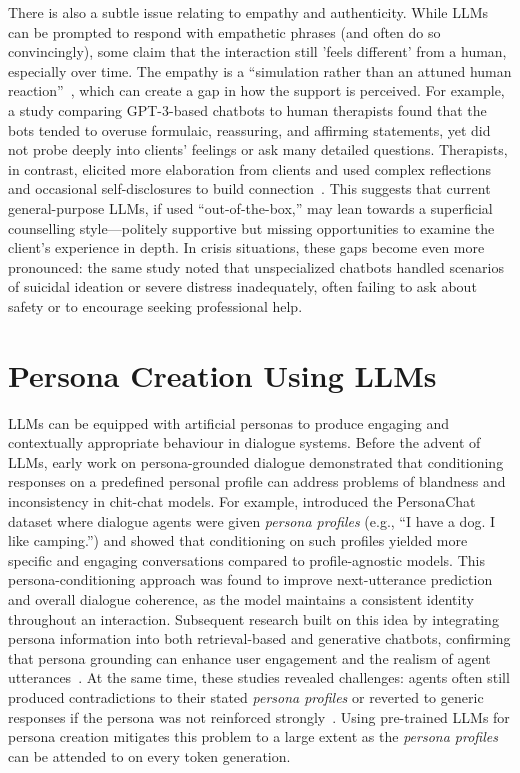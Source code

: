 There is also a subtle issue relating to empathy and authenticity. While LLMs can be prompted to respond with empathetic phrases (and often do so convincingly), some claim that the interaction still 'feels different' from a human, especially over time. The empathy is a ``simulation rather than an attuned human reaction''~\cite{SEITZ2024100067}, which can create a gap in how the support is perceived. For example, a study comparing GPT-3-based chatbots to human therapists found that the bots tended to overuse formulaic, reassuring, and affirming statements, yet did not probe deeply into clients' feelings or ask many detailed questions. Therapists, in contrast, elicited more elaboration from clients and used complex reflections and occasional self-disclosures to build connection~\cite{Scholich2025}. This suggests that current general-purpose LLMs, if used ``out-of-the-box,'' may lean towards a superficial counselling style---politely supportive but missing opportunities to examine the client's experience in depth. In crisis situations, these gaps become even more pronounced: the same study noted that unspecialized chatbots handled scenarios of suicidal ideation or severe distress inadequately, often failing to ask about safety or to encourage seeking professional help.


\section{Persona Creation Using LLMs}
LLMs can be equipped with artificial personas to produce engaging and contextually appropriate behaviour in dialogue systems. Before the advent of LLMs, early work on persona-grounded dialogue demonstrated that conditioning responses on a predefined personal profile can address problems of blandness and inconsistency in chit-chat models. For example, \citet{zhang-etal-2018-personalizing} introduced the PersonaChat dataset where dialogue agents were given \emph{persona profiles} (e.g., ``I have a dog. I like camping.'') and showed that conditioning on such profiles yielded more specific and engaging conversations compared to profile-agnostic models. This persona-conditioning approach was found to improve next-utterance prediction and overall dialogue coherence, as the model maintains a consistent identity throughout an interaction. Subsequent research built on this idea by integrating persona information into both retrieval-based and generative chatbots, confirming that persona grounding can enhance user engagement and the realism of agent utterances~\cite{roller-etal-2021-recipes, li-etal-2016-persona}. At the same time, these studies revealed challenges: agents often still produced contradictions to their stated \emph{persona profiles} or reverted to generic responses if the persona was not reinforced strongly~\cite{kim-etal-2020-will, song-etal-2020-generate}. Using pre-trained LLMs for persona creation mitigates this problem to a large extent as the \emph{persona profiles} can be attended to on every token generation.

